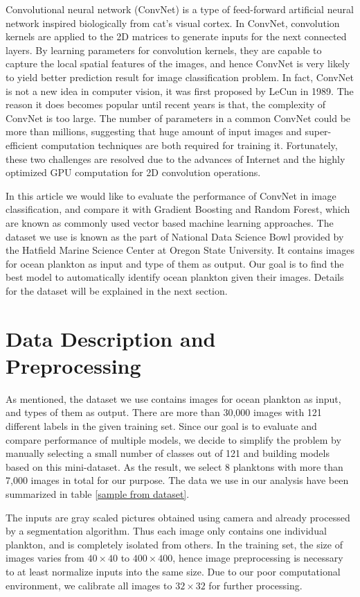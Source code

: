 \documentclass[11pt,oneside,a4paper]{article}
\numberwithin{equation}{section}
\begin{document}
Convolutional neural network (ConvNet) is a type of feed-forward artificial neural network inspired biologically from cat's visual cortex\cite{hubel1968receptive}. In ConvNet, convolution kernels are applied to the 2D matrices to generate inputs for the next connected layers. By learning parameters for convolution kernels, they are capable to capture the local spatial features of the images, and hence ConvNet is very likely to yield better prediction result for image classification problem. In fact, ConvNet is not a new idea in computer vision, it was first proposed by LeCun\cite{lecun1989generalization} in 1989. The reason it does becomes popular until recent years is that, the complexity of ConvNet is too large. The number of parameters in a common ConvNet could be more than millions, suggesting that huge amount of input images and super-efficient computation techniques are both required for training it. Fortunately, these two challenges are resolved due to the advances of Internet and the highly optimized GPU computation for 2D convolution operations.

In this article we would like to evaluate the performance of ConvNet in image classification, and compare it with Gradient Boosting and Random Forest, which are known as commonly used vector based machine learning approaches. The dataset we use is known as the part of National Data Science Bowl provided by the Hatfield Marine Science Center at Oregon State University. It contains images for ocean plankton as input and type of them as output. Our goal is to find the best model to automatically identify ocean plankton given their images. Details for the dataset will be explained in the next section.

\section{Data Description and Preprocessing}
As mentioned, the dataset we use contains images for ocean plankton as input, and types of them as output. There are more than 30,000 images with 121 different labels in the given training set. Since our goal is to evaluate and compare performance of multiple models, we decide to simplify the problem by manually selecting a small number of classes out of 121 and building models based on this mini-dataset. As the result, we select 8 planktons with more than 7,000 images in total for our purpose. The data we use in our analysis have been summarized in table \ref{sample from dataset}.

The inputs are gray scaled pictures obtained using camera and already processed by a segmentation algorithm. Thus each image only contains one individual plankton, and is completely isolated from others. In the training set, the size of images varies from $40 \times 40$ to $400 \times 400$, hence image preprocessing is necessary to at least normalize inputs into the same size. Due to our poor computational environment, we calibrate all images to $32 \times 32$ for further processing.
\end{document}
